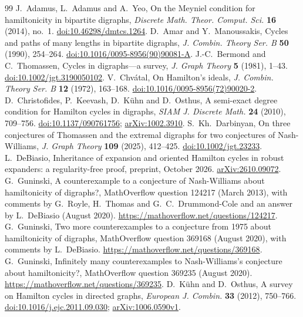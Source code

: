 \documentclass[11pt]{article}
\begin{document}
\begin{thebibliography}{99}
 J.~Adamus, L.~Adamus and A.~Yeo, On the Meyniel condition for hamiltonicity in bipartite digraphs, \emph{Discrete Math. Theor. Comput. Sci.} \textbf{16} (2014), no.~1. \href{https://doi.org/10.46298/dmtcs.1264}{doi:10.46298/dmtcs.1264}.
 D.~Amar and Y.~Manoussakis, Cycles and paths of many lengths in bipartite digraphs, \emph{J. Combin. Theory Ser. B} \textbf{50} (1990), 254--264. \href{https://doi.org/10.1016/0095-8956(90)90081-A}{doi:10.1016/0095-8956(90)90081-A}.
 J.-C.~Bermond and C.~Thomassen, Cycles in digraphs---a survey, \emph{J. Graph Theory} \textbf{5} (1981), 1--43. \href{https://doi.org/10.1002/jgt.3190050102}{doi:10.1002/jgt.3190050102}.
 V.~Chvátal, On Hamilton's ideals, \emph{J. Combin. Theory Ser. B} \textbf{12} (1972), 163--168. \href{https://doi.org/10.1016/0095-8956(72)90020-2}{doi:10.1016/0095-8956(72)90020-2}.
 D.~Christofides, P.~Keevash, D.~Kühn and D.~Osthus, A semi-exact degree condition for Hamilton cycles in digraphs, \emph{SIAM J. Discrete Math.} \textbf{24} (2010), 709--756. \href{https://doi.org/10.1137/090761756}{doi:10.1137/090761756}; \href{https://arxiv.org/abs/1002.3910}{arXiv:1002.3910}.
 S.~Kh.~Darbinyan, On three conjectures of Thomassen and the extremal digraphs for two conjectures of Nash-Williams, \emph{J. Graph Theory} \textbf{109} (2025), 412--425. \href{https://doi.org/10.1002/jgt.23233}{doi:10.1002/jgt.23233}.
 L.~DeBiasio, Inheritance of expansion and oriented Hamilton cycles in robust expanders: a regularity-free proof, preprint, October 2026. \href{https://arxiv.org/abs/2610.09072}{arXiv:2610.09072}.
 G.~Guninski, A counterexample to a conjecture of Nash-Williams about hamiltonicity of digraphs?, MathOverflow question 124217 (March 2013), with comments by G.~Royle, H.~Thomas and G.~C.~Drummond-Cole and an answer by L.~DeBiasio (August 2020). \url{https://mathoverflow.net/questions/124217}.
 G.~Guninski, Two more counterexamples to a conjecture from 1975 about hamiltonicity of digraphs, MathOverflow question 369168 (August 2020), with comments by L.~DeBiasio. \url{https://mathoverflow.net/questions/369168}.
 G.~Guninski, Infinitely many counterexamples to Nash-Williams's conjecture about hamiltonicity?, MathOverflow question 369235 (August 2020). \url{https://mathoverflow.net/questions/369235}.
 D.~Kühn and D.~Osthus, A survey on Hamilton cycles in directed graphs, \emph{European J. Combin.} \textbf{33} (2012), 750--766. \href{https://doi.org/10.1016/j.ejc.2011.09.030}{doi:10.1016/j.ejc.2011.09.030}; \href{https://arxiv.org/abs/1006.0590v1}{arXiv:1006.0590v1}.

\end{thebibliography}
\end{document}
